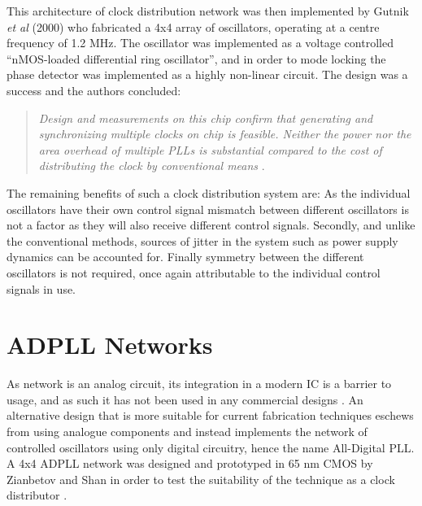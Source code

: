 This architecture of clock distribution network was then implemented by Gutnik \textit{et al} (2000) who fabricated a 4x4 array of oscillators, operating at a centre frequency of 1.2 MHz. The oscillator was implemented as a voltage controlled ``nMOS-loaded differential ring oscillator'', and in order to mode locking the phase detector was implemented as a highly non-linear circuit. The design was a success and the authors concluded:
\begin{quote}
	\textit{Design and measurements on this chip confirm that generating and synchronizing multiple clocks on chip is feasible. Neither the power nor the area overhead of multiple \acsp{PLL} is substantial compared to the cost of distributing the clock by conventional means} \cite{gutnik2000active}.
\end{quote}

The remaining benefits of such a clock distribution system are: As the individual oscillators have their own control signal mismatch between different oscillators is not a factor as they will also receive different control signals. Secondly, and unlike the conventional methods, sources of jitter in the system such as power supply dynamics can be accounted for. Finally symmetry between the different oscillators is not required, once again attributable to the individual control signals in use. 
\section{ADPLL Networks}
As  network is an analog circuit, its integration in a modern \ac{IC} is a barrier to usage, and as such it has not been used in any commercial designs \cite{zianbetov2013distributed}. An alternative design that is more suitable for current fabrication techniques eschews from using analogue components and instead implements the network of controlled oscillators using only digital circuitry, hence the name All-Digital \ac{PLL}. A 4x4 \ac{ADPLL} network was designed and prototyped in 65 nm CMOS by Zianbetov and Shan in order to test the suitability of the technique as a clock distributor \cite{zianbetov2013phd,shan2014phd}.

